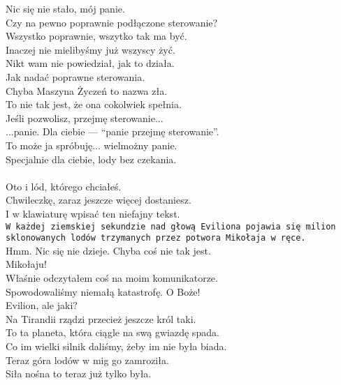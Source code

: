 \charprzy{}
Nic się nie stało, mój panie.\\
Czy na pewno poprawnie podłączone sterowanie?\\

\charmik{}
Wszystko poprawnie, wszytko tak ma być.\\
Inaczej nie mielibyśmy już wszyscy żyć.\\
Nikt wam nie powiedział, jak to działa.\\
Jak nadać poprawne sterowania.\\

\charprzy{}
Chyba Maszyna Życzeń to nazwa zła.\\
To nie tak jest, że ona cokolwiek spełnia.\\
Jeśli pozwolisz, przejmę sterowanie...\\

\chardok{}
...panie.
Dla ciebie --- "`panie przejmę sterowanie"'.\\

\charmik{}
To może ja spróbuję... wielmożny panie.\\
Specjalnie dla ciebie, lody bez czekania.\\
\\
Oto i lód, którego chciałeś.\\
Chwileczkę, zaraz jeszcze więcej dostaniesz.\\
I w klawiaturę wpisać ten niefajny tekst.\\
\texttt{W każdej ziemskiej sekundzie nad głową Eviliona pojawia się milion sklonowanych lodów trzymanych przez potwora Mikołaja w ręce.}\\
Hmm. Nic się nie dzieje. Chyba coś nie tak jest.\\

\charnad{}
Mikołaju!\\
Właśnie odczytałem coś na moim komunikatorze. \\
Spowodowaliśmy niemałą katastrofę. O Boże!\\
Evilion, ale jaki?\\
Na Tirandii rządzi przecież jeszcze król taki.\\
To ta planeta, która ciągle na swą gwiazdę spada.\\
Co im wielki silnik daliśmy, żeby im nie była biada.\\
Teraz góra lodów w mig go zamroziła.\\
Siła nośna to teraz już tylko była.\\

